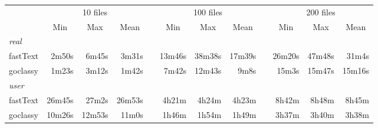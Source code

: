 \begin{table*}[t!]
    \centering\small
    \begin{tabular}{lrrrcrrrcrrr}\toprule
                 & \multicolumn{3}{c}{10 files} & \phantom{a}             & \multicolumn{3}{c}{100 files} & \phantom{a} & \multicolumn{3}{c}{200 files}                                                                                                                                        \\
        \cmidrule{2-4} \cmidrule{6-8} \cmidrule{10-12}
                 & \multicolumn{1}{c}{Min}      & \multicolumn{1}{c}{Max} & \multicolumn{1}{c}{Mean}      &             & \multicolumn{1}{c}{Min}       & \multicolumn{1}{c}{Max} & \multicolumn{1}{c}{Mean} &  & \multicolumn{1}{c}{Min} & \multicolumn{1}{c}{Max} & \multicolumn{1}{c}{Mean} \\ \midrule
        \emph{real}                                                                                                                                                                                                                                                                            \\
        fastText & 2m50s                        & 6m45s                   & 3m31s                         &             & 13m46s                        & 38m38s                  & 17m39s                   &  & 26m20s                  & 47m48s                  & 31m4s                    \\
        goclassy & 1m23s                        & 3m12s                   & 1m42s                         &             & 7m42s                         & 12m43s                  & 9m8s                     &  & 15m3s                   & 15m47s                  & 15m16s                   \\
        \emph{user}                                                                                                                                                                                                                                                                            \\
        fastText & 26m45s                       & 27m2s                   & 26m53s                        &             & 4h21m                         & 4h24m                   & 4h23m                    &  & 8h42m                   & 8h48m                   & 8h45m                    \\
        goclassy & 10m26s                       & 12m53s                  & 11m0s                         &             & 1h46m                         & 1h54m                   & 1h49m                    &  & 3h37m                   & 3h40m                   & 3h38m                    \\

\end{tabular}
\end{table*}
